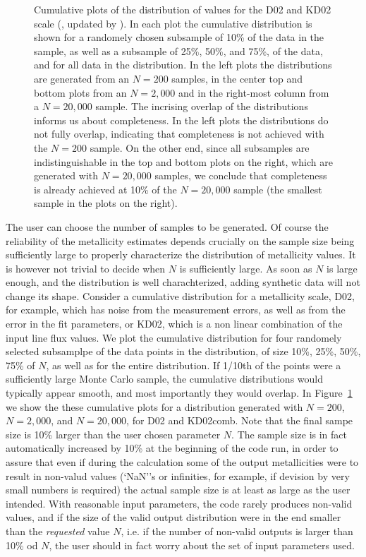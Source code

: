 \documentclass{emulateapj}
\begin{document}
\begin{figure}[!ht]
\caption{Cumulative plots of the distribution of values for the D02 \citep{denicolo02} and KD02 scale (\citealt{kewley02}, updated by \citealt{kewley08}). In each plot the cumulative distribution is shown for a randomely chosen subsample of 10\% of the data in the sample, as well as a subsample of 25\%, 50\%, and 75\%, of the data, and for all data in the distribution. In the left plots the distributions are generated from an $N=200$ samples, in the center top and bottom plots from an $N=2,000$  and in the right-most column from a $N=20,000$ sample. The incrising overlap of the distributions informs us about completeness. In the left plots the distributions do not fully overlap, indicating that completeness is not achieved with the $N=200$ sample. On the other end, since all subsamples are indistinguishable in the top and bottom plots on the right, which are generated with $N=20,000$ samples, we conclude that completeness is  already  achieved at 10\% of the $N=20,000$ sample (the smallest sample in the plots on the right).}
 \label{cd}
\end{figure}
The user can choose the number of samples to be generated. Of course the reliability of the metallicity estimates depends crucially on the sample size being sufficiently large to properly characterize the distribution of metallicity values. It is however not trivial to decide when $N$ is sufficiently large. As soon as $N$ is large enough, and the distribution is well charachterized, adding synthetic data will not change its shape. Consider a cumulative distribution for a metallicity scale, D02, for example, which has noise from the measurement errors, as well as from the error in the fit parameters, or KD02, which is a non linear combination of the input line flux values. We plot the cumulative distribution for four randomely selected subsamplpe of the data points in the distribution, of size 10\%, 25\%, 50\%, 75\% of $N$, as well as for the entire distribution. If 1/10th of the points were a sufficiently large Monte Carlo sample, the cumulative distributions would typically appear smooth, and most importantly they would overlap. In Figure~\ref{cd} we show the these cumulative plots for a distribution generated with $N=200$, $N=2,000$, and $N=20,000$, for D02 and KD02comb. Note that the final sampe size is 10\% larger than the user chosen parameter $N$. The sample size is in fact automatically increased by 10\% at the beginning of the code run, in order to assure that even if during the calculation some of the output metallicities were to result in non-valud values (`NaN''s or infinities, for example, if devision by very small numbers is required) the actual sample size is at least as large as the user intended. With reasonable input parameters, the code rarely produces non-valid values, and if the size of the valid output distribution were in the end smaller than the \emph{requested} value $N$, i.e. if the number of non-valid outputs is larger than 10\% od $N$, the user should in fact worry about the set of input parameters used. 
\end{document}
